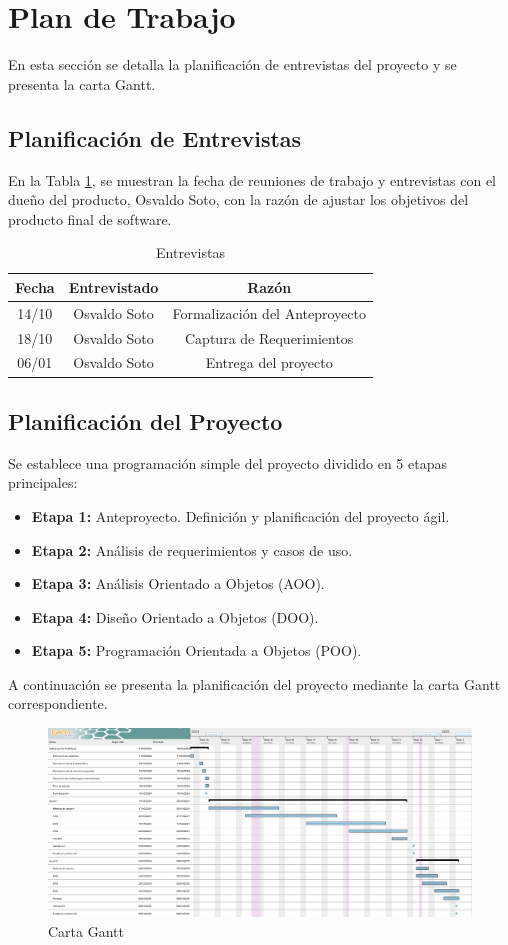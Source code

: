 \documentclass[letterpaper, 10pt]{article}
\begin{document}
\section{Plan de Trabajo}
En esta sección se detalla la planificación de entrevistas del proyecto y se presenta la carta Gantt.
\subsection{Planificación de Entrevistas}
En la Tabla \ref{table:4}, se muestran la fecha de reuniones de trabajo y entrevistas con el dueño del producto, Osvaldo Soto, con la razón de ajustar los objetivos del producto final de software.
\begin{table}[H]
    \centering
    \caption{Entrevistas}
    \begin{tabular}{|c|c|c|} \hline
        \textbf{Fecha} & \textbf{Entrevistado} & \textbf{Raz\'on} \\ \hline
         14/10 & Osvaldo Soto & Formalización del Anteproyecto\\\hline
         18/10 & Osvaldo Soto & Captura de Requerimientos\\\hline
         06/01 & Osvaldo Soto & Entrega del proyecto\\\hline
    \end{tabular}
    
    \label{table:4}
\end{table}
\subsection{Planificación del Proyecto}
Se establece una programación simple del proyecto dividido en 5 etapas principales:
\begin{itemize}
	\item \textbf{Etapa 1:} Anteproyecto. Definición y planificación del proyecto ágil.
	\item \textbf{Etapa 2:} Análisis de requerimientos y casos de uso.
	\item \textbf{Etapa 3:} Análisis Orientado a Objetos (AOO).
	\item \textbf{Etapa 4:} Diseño Orientado a Objetos (DOO).
	\item \textbf{Etapa 5:} Programación Orientada a Objetos (POO).
\end{itemize}
%
A continuación se presenta la planificación del proyecto mediante la carta Gantt correspondiente.
%
\begin{figure}[h]
	\centering
	\includegraphics[width=\textwidth]{img/CartaGantt.png}
	\caption{Carta Gantt}
	\label{fig:CartaGantt}
\end{figure}
\clearpage
\end{document}
